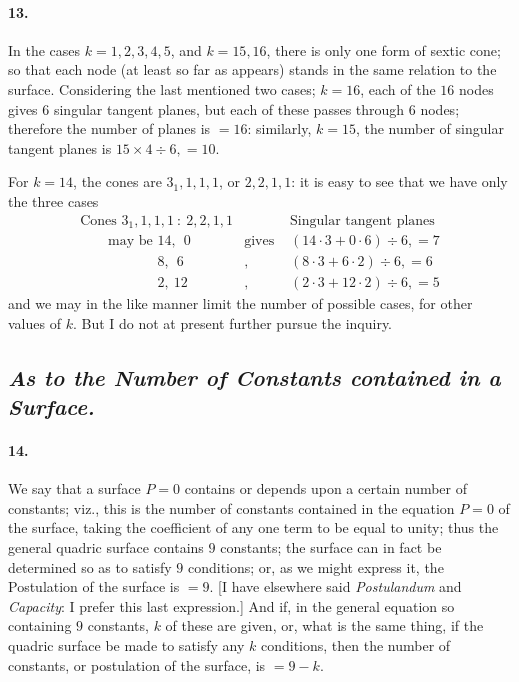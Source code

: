 \documentclass[11pt,a4paper]{article}
\begin{document}
\paragraph{13.}
In the cases $k = 1, 2, 3, 4, 5$, and $k = 15, 16$, there is only one form of sextic cone;
so that each node (at least so far as appears) stands in the same relation to the surface.
Considering the last mentioned two cases; $k = 16$, each of the $16$ nodes gives $6$
singular tangent planes, but each of these passes through $6$ nodes; therefore the number
of planes is $= 16$: similarly, $k = 15$, the number of singular tangent planes is
$15 \times 4 \div 6, = 10$.

\medskip

For $k = 14$, the cones are $3_1, 1, 1, 1$, or $2, 2, 1, 1$: it is easy to see that we have
only the three cases
\[
\begin{array}{lcl}
\text{Cones } 3_1, 1, 1, 1 \ :\ 2, 2, 1, 1 & & \text{Singular tangent planes} \\
\ \ \ \ \ \ \ \ \ \text{may be } 14,\ \ 0 & \text{gives } & (14 \cdot 3 + 0 \cdot 6) \div 6, = 7 \\
\ \ \ \ \ \ \ \ \ \phantom{\text{may be }}8,\ \ 6 & \text{,} & (8 \cdot 3 + 6 \cdot 2) \div 6, = 6 \\
\ \ \ \ \ \ \ \ \ \phantom{\text{may be }}2,\ 12 & \text{,} & (2 \cdot 3 + 12 \cdot 2) \div 6, = 5
\end{array}
\]
and we may in the like manner limit the number of possible cases, for other values of $k$.
But I do not at present further pursue the inquiry.

\subsection*{\textit{As to the Number of Constants contained in a Surface.}}

\paragraph{14.}
We say that a surface $P = 0$ contains or depends upon a certain number of constants; viz.,
this is the number of constants contained in the equation $P = 0$ of the surface, taking
the coefficient of any one term to be equal to unity; thus the general quadric surface
contains $9$ constants; the surface can in fact be determined so as to satisfy $9$
conditions; or, as we might express it, the Postulation of the surface is $= 9$. [I have
elsewhere said \textit{Postulandum} and \textit{Capacity}: I prefer this last expression.]
And if, in the general equation so containing $9$ constants, $k$ of these are given, or,
what is the same thing, if the quadric surface be made to satisfy any $k$ conditions, then
the number of constants, or postulation of the surface, is $= 9 - k$.
\end{document}

